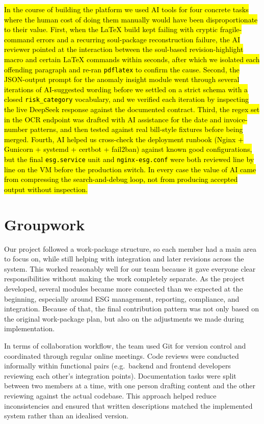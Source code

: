 \documentclass[11pt,a4paper]{article}
\newcommand{\new}[1]{\hl{#1}}
\begin{document}
\new{In the course of building the platform we used AI tools for four concrete tasks where the human cost of doing them manually would have been disproportionate to their value. First, when the LaTeX build kept failing with cryptic fragile-command errors and a recurring soul-package reconstruction failure, the AI reviewer pointed at the interaction between the soul-based revision-highlight macro and certain LaTeX commands within seconds, after which we isolated each offending paragraph and re-ran \texttt{pdflatex} to confirm the cause. Second, the JSON-output prompt for the anomaly insight module went through several iterations of AI-suggested wording before we settled on a strict schema with a closed \texttt{risk\_category} vocabulary, and we verified each iteration by inspecting the live DeepSeek response against the documented contract. Third, the regex set in the OCR endpoint was drafted with AI assistance for the date and invoice-number patterns, and then tested against real bill-style fixtures before being merged. Fourth, AI helped us cross-check the deployment runbook (Nginx + Gunicorn + systemd + certbot + fail2ban) against known good configurations, but the final \texttt{esg.service} unit and \texttt{nginx-esg.conf} were both reviewed line by line on the VM before the production switch. In every case the value of AI came from compressing the search-and-debug loop, not from producing accepted output without inspection.}

\section{Groupwork}
Our project followed a work-package structure, so each member had a main area to focus on, while still helping with integration and later revisions across the system. This worked reasonably well for our team because it gave everyone clear responsibilities without making the work completely separate. As the project developed, several modules became more connected than we expected at the beginning, especially around ESG management, reporting, compliance, and integration. Because of that, the final contribution pattern was not only based on the original work-package plan, but also on the adjustments we made during implementation.

In terms of collaboration workflow, the team used Git for version control and coordinated through regular online meetings. Code reviews were conducted informally within functional pairs (e.g.\ backend and frontend developers reviewing each other's integration points). Documentation tasks were split between two members at a time, with one person drafting content and the other reviewing against the actual codebase. This approach helped reduce inconsistencies and ensured that written descriptions matched the implemented system rather than an idealised version.
\end{document}
